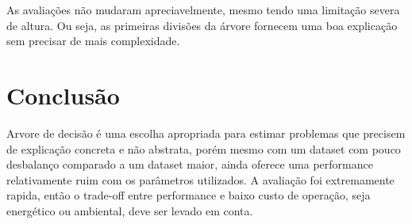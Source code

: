 \documentclass[12pt]{article}
\begin{document}
As avaliações não mudaram apreciavelmente, mesmo tendo uma limitação severa de altura. Ou seja, as primeiras divisões da árvore fornecem uma boa explicação sem precisar de mais complexidade.

\section{Conclusão}
Arvore de decisão é uma escolha apropriada para estimar problemas que precisem de explicação concreta e não abstrata, porém mesmo com um dataset com pouco desbalanço comparado a um dataset maior, ainda oferece uma performance relativamente ruim com os parâmetros utilizados. A avaliação foi extremamente rapida, então o trade-off entre performance e baixo custo de operação, seja energético ou ambiental, deve ser levado em conta.



\end{document}

